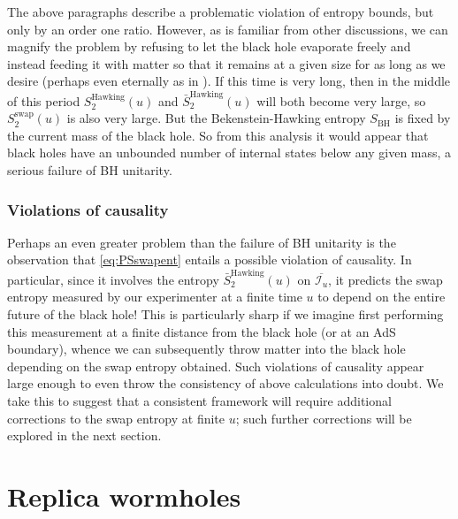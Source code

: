 \documentclass[letterpaper,12pt]{article}
\newcommand*{\scri}{\mathscr{I}} %
\begin{document}
The above paragraphs describe a problematic violation of entropy bounds, but only by an order one ratio. However, as is familiar from other discussions, we can magnify the problem by refusing to let the black hole evaporate freely and instead feeding it with matter so that it remains at a given size for as long as we desire (perhaps even eternally as in \cite{Almheiri:2019yqk}). If this time is very long, then in the middle of this period $S_2^\text{Hawking}(u)$ and $\bar S_2^\text{Hawking}(u)$ will both become very large, so $S^\text{swap}_2(u)$ is also very large.  But the Bekenstein-Hawking entropy $S_\text{BH}$ is fixed by the current mass of the black hole.  So from this analysis it would appear that black holes have an unbounded number of internal states below any given mass, a serious failure of BH unitarity.


\subsubsection{Violations of causality}
\label{sec:PSCausality}

Perhaps an even greater problem than the failure of BH unitarity is the observation that  \eqref{eq:PSswapent} entails a possible violation of causality.  In particular, since it involves the entropy $\bar S_2^\text{Hawking}(u)$ on $\overline{\scri_u}$, it predicts the swap entropy measured by our experimenter at a finite time $u$ to depend on the entire future of the black hole!  This is particularly sharp if we imagine first performing this measurement at a finite distance from the black hole (or at an AdS boundary), whence we can subsequently throw matter into the black hole depending on the swap entropy obtained.  Such violations of causality appear large enough to even throw the consistency of above calculations into doubt. We take this to suggest that a consistent framework will require additional corrections to the swap entropy at finite $u$; such further corrections will be explored in the next section.


\section{Replica wormholes}
\label{sec:replicas}
\end{document}
